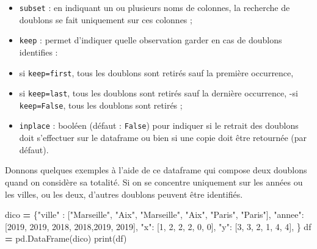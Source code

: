 \documentclass[12pt,]{book}
\newenvironment{Shaded}{\begin{snugshade}}{\end{snugshade}}
\newcommand{\DecValTok}[1]{\textcolor[rgb]{0.00,0.00,0.81}{#1}}
\newcommand{\StringTok}[1]{\textcolor[rgb]{0.31,0.60,0.02}{#1}}
\newcommand{\OperatorTok}[1]{\textcolor[rgb]{0.81,0.36,0.00}{\textbf{#1}}}
\newcommand{\BuiltInTok}[1]{#1}
\newcommand{\NormalTok}[1]{#1}
\numberwithin{equation}{section}
\numberwithin{countremarque}{section}
\begin{document}
\begin{itemize}
\item
  \texttt{subset} : en indiquant un ou plusieurs noms de colonnes, la
  recherche de doublons se fait uniquement sur ces colonnes ;
\item
  \texttt{keep} : permet d'indiquer quelle observation garder en cas de
  doublons identifies :
\item
  si \texttt{keep=\textquotesingle{}first\textquotesingle{}}, tous les
  doublons sont retirés sauf la première occurrence,
\item
  si \texttt{keep=\textquotesingle{}last\textquotesingle{}}, tous les
  doublons sont retirés sauf la dernière occurrence, -si
  \texttt{keep=\textquotesingle{}False\textquotesingle{}}, tous les
  doublons sont retirés ;
\item
  \texttt{inplace} : booléen (défaut : \texttt{False}) pour indiquer si
  le retrait des doublons doit s'effectuer sur le dataframe ou bien si
  une copie doit être retournée (par défaut).
\end{itemize}

Donnons quelques exemples à l'aide de ce dataframe qui compose deux
doublons quand on considère sa totalité. Si on se concentre uniquement
sur les années ou les villes, ou les deux, d'autres doublons peuvent
être identifiés.

\begin{Shaded}
\begin{Highlighting}[]
\NormalTok{dico }\OperatorTok{=}\NormalTok{ \{}\StringTok{"ville"}\NormalTok{ : [}\StringTok{"Marseille"}\NormalTok{, }\StringTok{"Aix"}\NormalTok{,}
                   \StringTok{"Marseille"}\NormalTok{, }\StringTok{"Aix"}\NormalTok{, }\StringTok{"Paris"}\NormalTok{, }\StringTok{"Paris"}\NormalTok{],}
        \StringTok{"annee"}\NormalTok{: [}\DecValTok{2019}\NormalTok{, }\DecValTok{2019}\NormalTok{, }\DecValTok{2018}\NormalTok{, }\DecValTok{2018}\NormalTok{,}\DecValTok{2019}\NormalTok{, }\DecValTok{2019}\NormalTok{],}
        \StringTok{"x"}\NormalTok{: [}\DecValTok{1}\NormalTok{, }\DecValTok{2}\NormalTok{, }\DecValTok{2}\NormalTok{, }\DecValTok{2}\NormalTok{, }\DecValTok{0}\NormalTok{, }\DecValTok{0}\NormalTok{],}
        \StringTok{"y"}\NormalTok{: [}\DecValTok{3}\NormalTok{, }\DecValTok{3}\NormalTok{, }\DecValTok{2}\NormalTok{, }\DecValTok{1}\NormalTok{, }\DecValTok{4}\NormalTok{, }\DecValTok{4}\NormalTok{],}
\NormalTok{       \} }
\NormalTok{df }\OperatorTok{=}\NormalTok{ pd.DataFrame(dico)}
\BuiltInTok{print}\NormalTok{(df)}
\end{Highlighting}
\end{Shaded}
\end{document}

